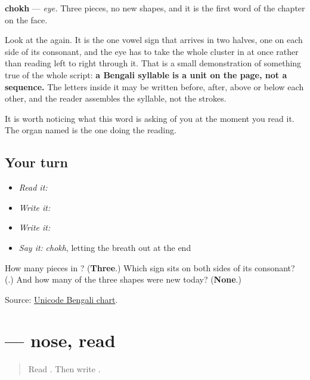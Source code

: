 \textbf{chokh} — \emph{eye.} Three pieces, no new shapes, and it is the first word of the chapter on the face.

Look at the \textbf{} again. It is the one vowel sign that arrives in two halves, one on each side of its consonant, and the eye has to take the whole cluster in at once rather than reading left to right through it. That is a small demonstration of something true of the whole script: \textbf{a Bengali syllable is a unit on the page, not a sequence.} The letters inside it may be written before, after, above or below each other, and the reader assembles the syllable, not the strokes.

It is worth noticing what this word is asking of you at the moment you read it. The organ named is the one doing the reading.

\subsection*{Your turn}
\begin{itemize}
\raggedright
  \item \emph{Read it:} 
  \item \emph{Write it:} 
  \item \emph{Write it:}  
  \item \emph{Say it:} \emph{chokh}, letting the breath out at the end
\end{itemize}

\begin{tcolorbox}[breakable,colback=teal!4,colframe=teal!35!black,title={Before you move on}]
How many pieces in \textbf{}? (\textbf{Three}.) Which sign sits on both sides of its consonant? (\textbf{}.) And how many of the three shapes were new today? (\textbf{None}.)

Source: \href{https://www.unicode.org/charts/PDF/U0980.pdf}{Unicode Bengali chart}.
\end{tcolorbox}
\section[\texorpdfstring{\bn{নাক} (nāk)}{নাক (nāk)}]{ — nose, read}

\label{lesson:BN-W04-nak-read}



\begin{quote}
Read \textbf{}. Then write \textbf{}.
\end{quote}

